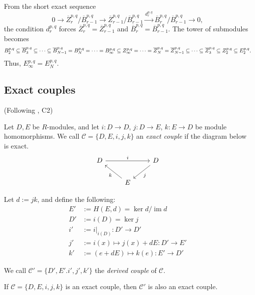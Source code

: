 \documentclass{MetricNotes2023}
\def\subq{\ensuremath\subseteq}
\DeclareMathOperator{\im}{im}
\begin{document}
From the short exact sequence 
\[0 \to \overline Z^{p,q}_{r}/\overline B_{r-1}^{p,q}\to \overline Z_{r-1}^{p,q}/\overline B_{r-1}^{p,q} \xrightarrow{d_{r}^{p,q}} \overline B_{r}^{p,q}/\overline{B}_{r-1}^{p,q}\to 0,\]
the condition \(d_r^{p,q}\) forces  \(\overline{Z}^{p,q}_r=\overline{Z}_{r-1}^{p,q}\) and \(\overline{B}^{p,q}_r=\overline{B}_{r-1}^{p,q}\). The tower of submodules becomes
\[B_2^{p,q}\subq \overline B_3^{p,q}\subq \cdots \subq \overline B_{N-1}^{p,q}=B_N^{p,q}= \cdots=B_\infty^{p,q} \subq Z_\infty^{p,q}= \cdots = \overline Z_N^{p,q}=\overline Z^{p,q}_{N-1}\subq \cdots \subq \overline Z_3^{p,q}\subq Z_2^{p,q}\subq E_2^{p,q}.\]
Thus, \(E_\infty^{p,q}=E_N^{p,q}\). 

\subsection{Exact couples}\label{2503301333}

(Following \autocite{spectral_sequences}, C2)

\begin{definition}
Let \(D, E\) be \(R\)-modules, and let \(i : D \to D\), \(j : D\to E\), \(k : E \to D\) be module homomorphisms. We call \(\mathcal{C}=\{D, E, i, j, k\}\) an \textit{exact couple} if the diagram below is exact.
\[\begin{tikzcd}
 D \arrow[rr, "i"] && D \arrow[dl, "j"] \\ 
  & E \arrow[ul, "k"] &  
 \end{tikzcd}\] 
\end{definition}

Let \(d:=jk\), and define the following:
\begin{align*}
E'&:=H(E, d)=\ker d/\im d\\
D'&:=i(D)=\ker j\\
i'&:=i|_{i(D)} : D'\to D'\\
j'&:=i(x)\mapsto j(x)+dE : D'\to E'\\
k'&:=(e+dE)\mapsto k(e) : E' \to D'
\end{align*}

We call \(\mathcal{C}'=\{D', E'. i', j', k'\}\) the \textit{derived couple} of \(\mathcal{C}\). 

\begin{proposition}
If \(\mathcal{C}=\{D, E, i, j, k\}\) is an exact couple, then \(\mathcal{C}'\) is also an exact couple.
\end{proposition}
\end{document}
